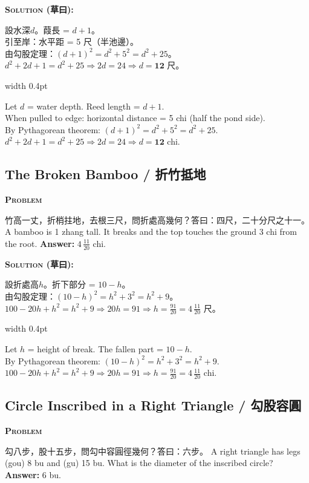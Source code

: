 \documentclass[10pt,a4paper]{article}
\newcommand{\zh}[1]{{\CJKfamily{notocjksc}#1}}
\newcommand{\bilingual}[2]{%
  \par\smallskip\noindent%
  \begin{minipage}[t]{0.47\textwidth}%
    \RaggedRight\small #1%
  \end{minipage}%
  \hfill\vrule width 0.4pt\hfill%
  \begin{minipage}[t]{0.47\textwidth}%
    \RaggedRight\small #2%
  \end{minipage}%
  \par\smallskip%
}
\newenvironment{biproblem}[2][]{%
  \par\smallskip\vspace{1.5ex}%
  \noindent\textbf{\textcolor{problemframe}{\textsc{Problem} #1}}\par\smallskip
  \bgroup\small%
}{%
  \egroup\par\smallskip
}
\newenvironment{bisolution}{%
  \par\smallskip\noindent\textbf{\textcolor{notecolor}{\textsc{Solution} (草曰):}}\par\smallskip\itshape\small%
}{%
  \par\smallskip\normalfont%
}
\begin{document}
\begin{bisolution}
\bilingual{
  設水深$d$。葭長 = $d + 1$。\\
  引至岸：水平距 = 5 尺（半池邊）。\\
  由勾股定理：$(d+1)^2 = d^2 + 5^2 = d^2 + 25$。\\
  $d^2 + 2d + 1 = d^2 + 25 \Rightarrow 2d = 24 \Rightarrow d = \textbf{12}$ 尺。
}{%
  Let $d$ = water depth. Reed length = $d + 1$.\\
  When pulled to edge: horizontal distance = 5 chi (half the pond side).\\
  By Pythagorean theorem: $(d+1)^2 = d^2 + 5^2 = d^2 + 25$.\\
  $d^2 + 2d + 1 = d^2 + 25 \Rightarrow 2d = 24 \Rightarrow d = \textbf{12}$ chi.
}
\end{bisolution}

\subsection{The Broken Bamboo / 折竹抵地}

\begin{biproblem}
\bilingual{
  \zh{竹高一丈，折梢拄地，去根三尺，問折處高幾何？答曰：四尺，二十分尺之十一。}
}{%
  A bamboo is 1 zhang tall. It breaks and the top touches the ground 3 chi from the root. \textbf{Answer:} $4\,\frac{11}{20}$ chi.
}
\end{biproblem}

\begin{bisolution}
\bilingual{
  設折處高$h$。折下部分 = $10 - h$。\\
  由勾股定理：$(10-h)^2 = h^2 + 3^2 = h^2 + 9$。\\
  $100 - 20h + h^2 = h^2 + 9 \Rightarrow 20h = 91 \Rightarrow h = \frac{91}{20} = 4\,\frac{11}{20}$ 尺。
}{%
  Let $h$ = height of break. The fallen part = $10 - h$.\\
  By Pythagorean theorem: $(10-h)^2 = h^2 + 3^2 = h^2 + 9$.\\
  $100 - 20h + h^2 = h^2 + 9 \Rightarrow 20h = 91 \Rightarrow h = \frac{91}{20} = 4\,\frac{11}{20}$ chi.
}
\end{bisolution}

\subsection{Circle Inscribed in a Right Triangle / 勾股容圓}

\begin{biproblem}
\bilingual{
  \zh{勾八步，股十五步，問勾中容圓徑幾何？答曰：六步。}
}{%
  A right triangle has legs (gou) 8 bu and (gu) 15 bu. What is the diameter of the inscribed circle? \textbf{Answer:} 6 bu.
}
\end{biproblem}
\end{document}
